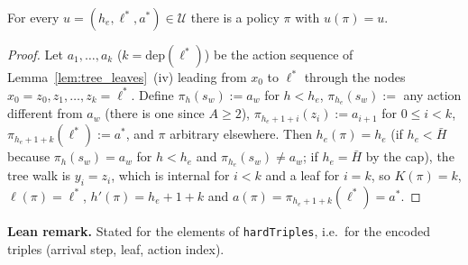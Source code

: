 \begin{lemma}\label{lem:lb_realizing_exists}
\leanok
For every $u = (h_e, \ell^*, a^*) \in \mathcal U$ there is a policy $\pi$ with $u(\pi) = u$.
\end{lemma}

\begin{proof}
\leanok
{}
Let $a_1, \dots, a_{k}$ ($k = \mathrm{dep}(\ell^*)$) be the action sequence of
Lemma~\ref{lem:tree_leaves}~(iv) leading from $x_0$ to $\ell^*$ through the nodes
$x_0 = z_0, z_1, \dots, z_k = \ell^*$. Define $\pi_h(s_w) := a_w$ for $h < h_e$, $\pi_{h_e}(s_w) := $
any action different from $a_w$ (there is one since $A \ge 2$), $\pi_{h_e + 1 + i}(z_i) := a_{i+1}$
for $0 \le i < k$, $\pi_{h_e + 1 + k}(\ell^*) := a^*$, and $\pi$ arbitrary elsewhere. Then
$h_e(\pi) = h_e$ (if $h_e < \bar H$ because $\pi_h(s_w) = a_w$ for $h < h_e$ and
$\pi_{h_e}(s_w) \ne a_w$; if $h_e = \bar H$ by the cap), the tree walk is
$y_i = z_i$, which is internal for $i < k$ and a leaf for $i = k$, so $K(\pi) = k$,
$\ell(\pi) = \ell^*$, $h'(\pi) = h_e + 1 + k$ and $a(\pi) = \pi_{h_e+1+k}(\ell^*) = a^*$.
\end{proof}

\textbf{Lean remark.} Stated for the elements of \texttt{hardTriples}, i.e.\ for the encoded triples
(arrival step, leaf, action index).

